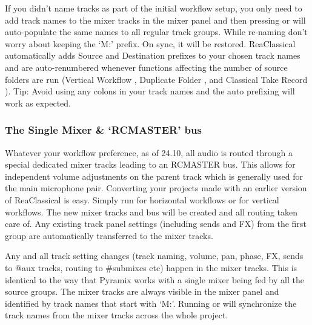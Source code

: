 \documentclass[10pt,american]{article}
\begin{document}
If you didn't name tracks as part of the initial workflow setup, you only need
to add track names to the mixer tracks in the mixer panel and then pressing
 or  will auto-populate the same names to all regular track
groups. While re-naming don't worry about keeping the `M:' prefix. On sync, it
will be restored. ReaClassical automatically adds Source and Destination
prefixes to your chosen track names and are auto-renumbered whenever functions
affecting the number of source folders are run (Vertical Workflow ,
Duplicate Folder \keys{\textbackslash}, and Classical Take Record ).
Tip: Avoid using any colons in your track names and the auto prefixing will work
as expected. 

\noindent{}

\subsubsection{The Single Mixer \& \textquoteleft RCMASTER\textquoteright{} bus}

Whatever your workflow preference, as of 24.10, all audio is routed through a
special dedicated mixer tracks leading to an RCMASTER bus. This allows for
independent volume adjustments on the parent track which is generally used for
the main microphone pair. Converting your projects made with an earlier version
of ReaClassical is easy. Simply run  for horizontal workflows or
 for vertical workflows. The new mixer tracks and bus will be created
and all routing taken care of. Any existing track panel settings (including
sends and FX) from the first group are automatically transferred to the mixer
tracks.

Any and all track setting changes (track naming, volume, pan, phase, FX, sends
to @aux tracks, routing to \#submixes etc) happen in the mixer tracks. This is
identical to the way that Pyramix works with a single mixer being fed by all the
source groups. The mixer tracks are always visible in the mixer panel and
identified by track names that start with `M:'. Running  or 
will synchronize the track names from the mixer tracks across the whole project. 
\end{document}
